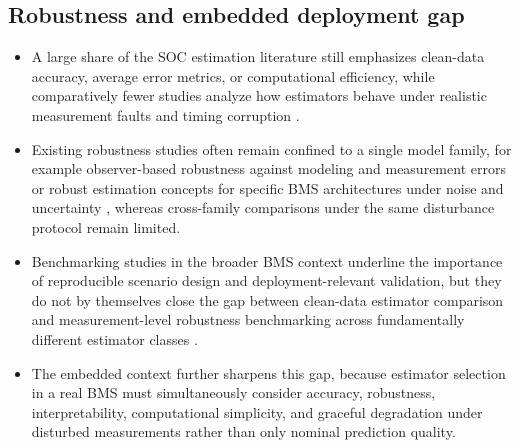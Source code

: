 \documentclass[review,nopreprintline]{elsarticle}
\begin{document}
\subsection{Robustness and embedded deployment gap}
\begin{itemize}[leftmargin=*]
    \item A large share of the SOC estimation literature still emphasizes clean-data accuracy, average error metrics, or computational efficiency, while comparatively fewer studies analyze how estimators behave under realistic measurement faults and timing corruption \cite{shrivastavaReviewTechnologicalAdvancement2023,Embedded_AI_only_SOC_mobile,giazitzisCaseStudyTiny2024,mazziStateChargeEstimation2022}.
    \item Existing robustness studies often remain confined to a single model family, for example observer-based robustness against modeling and measurement errors \cite{liRobustnessSOCEstimation2015} or robust estimation concepts for specific BMS architectures under noise and uncertainty \cite{naseriReliableWirelessBMS2025}, whereas cross-family comparisons under the same disturbance protocol remain limited.
    \item Benchmarking studies in the broader BMS context underline the importance of reproducible scenario design and deployment-relevant validation, but they do not by themselves close the gap between clean-data estimator comparison and measurement-level robustness benchmarking across fundamentally different estimator classes \cite{bergerBenchmarkingBatteryManagement2024}.
    \item The embedded context further sharpens this gap, because estimator selection in a real BMS must simultaneously consider accuracy, robustness, interpretability, computational simplicity, and graceful degradation under disturbed measurements rather than only nominal prediction quality.
\end{itemize}
\end{document}
